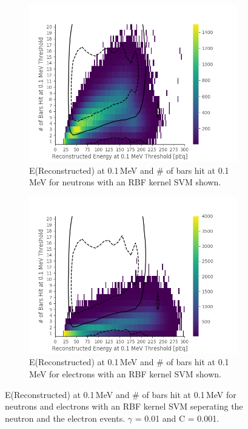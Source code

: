 \documentclass[12pt,a4paper]{article}
\begin{document}
\begin{figure}[H]
\centering
\begin{subfigure}{.5\textwidth}
  \centering
  \includegraphics[width=\linewidth]{chosen_svm_neutron_rbf.png}
  \captionsetup{width=.9\linewidth}
  \caption{E(Reconstructed) at 0.1\,MeV and \# of bars hit at 0.1\,MeV for neutrons with an RBF kernel SVM shown.}
  \label{rbf_svm_neutron}
\end{subfigure}%
\begin{subfigure}{.5\textwidth}
  \centering
  \includegraphics[width=\linewidth]{chosen_svm_electron_rbf.png}
  \captionsetup{width=.9\linewidth}
  \caption{E(Reconstructed) at 0.1\,MeV and \# of bars hit at 0.1\,MeV for electrons with an RBF kernel SVM shown.}
  \label{rbf_svm_electron}
\end{subfigure}
\caption{E(Reconstructed) at 0.1\,MeV and \# of bars hit at 0.1\,MeV for neutrons and electrons with an RBF kernel SVM seperating the neutron and the electron events. $\gamma$ = 0.01 and C = 0.001.}
\label{rbf_svm_on_neutrons_and_electrons}
\end{figure}
\end{document}
